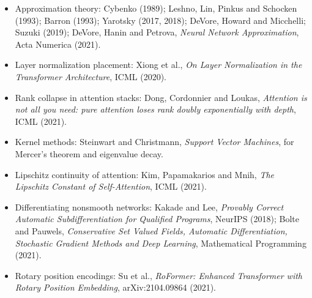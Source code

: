 \begin{itemize}
\tightlist
\item
  Approximation theory: Cybenko (1989); Leshno, Lin, Pinkus and Schocken
  (1993); Barron (1993); Yarotsky (2017, 2018); DeVore, Howard and
  Micchelli; Suzuki (2019); DeVore, Hanin and Petrova, \emph{Neural
  Network Approximation}, Acta Numerica (2021).
\item
  Layer normalization placement: Xiong et al., \emph{On Layer
  Normalization in the Transformer Architecture}, ICML (2020).
\item
  Rank collapse in attention stacks: Dong, Cordonnier and Loukas,
  \emph{Attention is not all you need: pure attention loses rank doubly
  exponentially with depth}, ICML (2021).
\item
  Kernel methods: Steinwart and Christmann, \emph{Support Vector
  Machines}, for Mercer's theorem and eigenvalue decay.
\item
  Lipschitz continuity of attention: Kim, Papamakarios and Mnih,
  \emph{The Lipschitz Constant of Self-Attention}, ICML (2021).
\item
  Differentiating nonsmooth networks: Kakade and Lee, \emph{Provably
  Correct Automatic Subdifferentiation for Qualified Programs}, NeurIPS
  (2018); Bolte and Pauwels, \emph{Conservative Set Valued Fields,
  Automatic Differentiation, Stochastic Gradient Methods and Deep
  Learning}, Mathematical Programming (2021).
\item
  Rotary position encodings: Su et al., \emph{RoFormer: Enhanced
  Transformer with Rotary Position Embedding}, arXiv:2104.09864 (2021).
\end{itemize}
